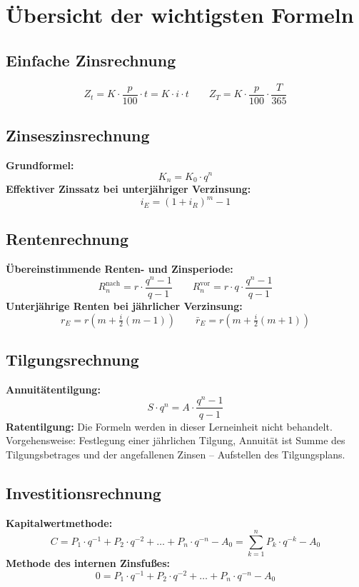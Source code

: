 \chapter{Übersicht der wichtigsten Formeln}

\section*{Einfache Zinsrechnung}
\[ Z_t = K \cdot \frac{p}{100} \cdot t = K \cdot i \cdot t \qquad Z_T = K \cdot \frac{p}{100} \cdot \frac{T}{365} \]

\section*{Zinseszinsrechnung}
\textbf{Grundformel:} \[ K_n = K_0 \cdot q^n \]
\textbf{Effektiver Zinssatz bei unterjähriger Verzinsung:} \[ i_E = (1 + i_R)^m - 1 \]

\section*{Rentenrechnung}
\textbf{Übereinstimmende Renten- und Zinsperiode:}
\[ R_n^{\text{nach}} = r \cdot \frac{q^n - 1}{q - 1} \qquad R_n^{\text{vor}} = r \cdot q \cdot \frac{q^n - 1}{q - 1} \]
\textbf{Unterjährige Renten bei jährlicher Verzinsung:}
\[ r_E = r \left(m + \tfrac{i}{2}(m - 1)\right) \qquad \bar{r}_E = r \left(m + \tfrac{i}{2}(m + 1)\right) \]

\section*{Tilgungsrechnung}
\textbf{Annuitätentilgung:} \[ S \cdot q^n = A \cdot \frac{q^n - 1}{q - 1} \]
\textbf{Ratentilgung:} Die Formeln werden in dieser Lerneinheit nicht behandelt.\\
Vorgehensweise: Festlegung einer jährlichen Tilgung, Annuität ist Summe des Tilgungsbetrages und der angefallenen Zinsen -- Aufstellen des Tilgungsplans.

\section*{Investitionsrechnung}
\textbf{Kapitalwertmethode:}
\[ C = P_1 \cdot q^{-1} + P_2 \cdot q^{-2} + \ldots + P_n \cdot q^{-n} - A_0 = \sum_{k=1}^{n} P_k \cdot q^{-k} - A_0 \]
\textbf{Methode des internen Zinsfußes:}
\[ 0 = P_1 \cdot q^{-1} + P_2 \cdot q^{-2} + \ldots + P_n \cdot q^{-n} - A_0 \]

